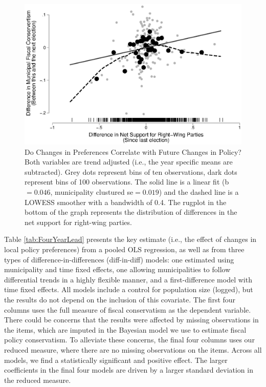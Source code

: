 \documentclass[a4paper,12pt]{article}
\begin{document}
\begin{figure}[h]
	\centering
	\includegraphics[scale = 0.8]{scatterplot.eps}
	\caption{Do Changes in Preferences Correlate with Future Changes in Policy? Both variables are trend adjusted (i.e., the year specific means are subtracted). Grey dots represent bins of ten observations, dark dots represent bins of 100  observations. The solid line is a linear fit (b$=0.046$, municipality clustured se$=0.019$) and the dashed line is a LOWESS smoother with a bandwidth of 0.4. The rugplot in the bottom of the graph represents the distribution of differences in the net support for right-wing parties. }
	\label{fig:scatter}
\end{figure}




Table \ref{tab:FourYearLead} presents the key estimate (i.e., the effect of changes in local policy preferences) from a pooled OLS regression, as well as from three types of difference-in-differences (diff-in-diff) models: one estimated using municipality and time fixed effects, one allowing municipalities to follow differential trends in a highly flexible manner, and a first-difference model with time fixed effects. All models include a control for population size (logged), but the results do not depend on the inclusion of this covariate.  The  first four columns uses the full measure of fiscal conservatism as the dependent variable. There could be concerns that the results were affected by missing observations in the items, which are imputed in the Bayesian model we use to estimate fiscal policy conservatism. To alleviate these concerns, the final four columns uses our reduced measure, where there are no missing observations on the items. Across all models, we find a statistically significant and positive effect. The larger coefficients in the final four models are driven by a larger standard deviation in the reduced measure.
\end{document}

